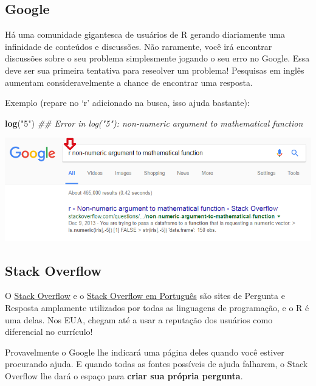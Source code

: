 \documentclass[]{book}
\newenvironment{Shaded}{\begin{snugshade}}{\end{snugshade}}
\newcommand{\CommentTok}[1]{\textcolor[rgb]{0.56,0.35,0.01}{\textit{#1}}}
\newcommand{\KeywordTok}[1]{\textcolor[rgb]{0.13,0.29,0.53}{\textbf{#1}}}
\newcommand{\NormalTok}[1]{#1}
\newcommand{\StringTok}[1]{\textcolor[rgb]{0.31,0.60,0.02}{#1}}
\begin{document}
\hypertarget{google}{%
\subsection{Google}\label{google}}

Há uma comunidade gigantesca de usuários de R gerando diariamente uma infinidade de conteúdos e discussões. Não raramente, você irá encontrar discussões sobre o seu problema simplesmente jogando o seu erro no Google. Essa deve ser sua primeira tentativa para reseolver um problema! Pesquisas em inglês aumentam consideravelmente a chance de encontrar uma resposta.

Exemplo (repare no `r' adicionado na busca, isso ajuda bastante):

\begin{Shaded}
\begin{Highlighting}[]
\KeywordTok{log}\NormalTok{(}\StringTok{"5"}\NormalTok{)}
\CommentTok{## Error in log("5"): non-numeric argument to mathematical function}
\end{Highlighting}
\end{Shaded}

\begin{center}\includegraphics[width=11.04in]{img/r-base/ajuda_google} \end{center}

\hypertarget{stack-overflow}{%
\subsection{Stack Overflow}\label{stack-overflow}}

O \href{http://stackoverflow.com/}{Stack Overflow} e o \href{http://pt.stackoverflow.com/}{Stack Overflow em Português} são sites de Pergunta e Resposta amplamente utilizados por todas as linguagens de programação, e o R é uma delas. Nos EUA, chegam até a usar a reputação dos usuários como diferencial no currículo!

Provavelmente o Google lhe indicará uma página deles quando você estiver procurando ajuda. E quando todas as fontes possíveis de ajuda falharem, o Stack Overflow lhe dará o espaço para \textbf{criar sua própria pergunta}.
\end{document}
